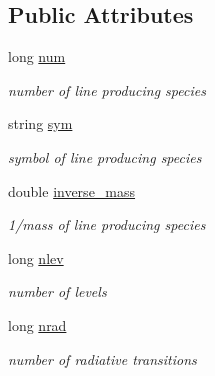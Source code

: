 \subsection*{Public Attributes}
\begin{DoxyCompactItemize}
\item 
\mbox{\label{structLinedata_a31cad37c5cab2d17996b8efce5308e06}} 
long \mbox{\hyperlink{structLinedata_a31cad37c5cab2d17996b8efce5308e06}{num}}
\begin{DoxyCompactList}\small\item\em number of line producing species \end{DoxyCompactList}\item 
\mbox{\label{structLinedata_ab6519202beb7c464418295a9b65e044c}} 
string \mbox{\hyperlink{structLinedata_ab6519202beb7c464418295a9b65e044c}{sym}}
\begin{DoxyCompactList}\small\item\em symbol of line producing species \end{DoxyCompactList}\item 
\mbox{\label{structLinedata_adbb1b0fe9d8d409c26d764a3a4a8985b}} 
double \mbox{\hyperlink{structLinedata_adbb1b0fe9d8d409c26d764a3a4a8985b}{inverse\+\_\+mass}}
\begin{DoxyCompactList}\small\item\em 1/mass of line producing species \end{DoxyCompactList}\item 
\mbox{\label{structLinedata_a2475c8cd835885bf01071f6d11c41e86}} 
long \mbox{\hyperlink{structLinedata_a2475c8cd835885bf01071f6d11c41e86}{nlev}}
\begin{DoxyCompactList}\small\item\em number of levels \end{DoxyCompactList}\item 
\mbox{\label{structLinedata_a9b057d75ef956bbec3d0efe352836382}} 
long \mbox{\hyperlink{structLinedata_a9b057d75ef956bbec3d0efe352836382}{nrad}}
\begin{DoxyCompactList}\small\item\em number of radiative transitions \end{DoxyCompactList}\item 

\end{DoxyCompactItemize}
